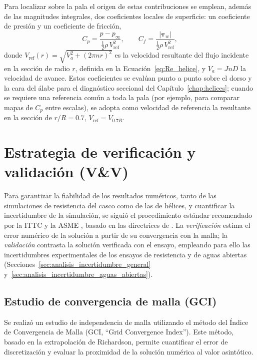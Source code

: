 Para localizar sobre la pala el origen de estas contribuciones se emplean, además de
las magnitudes integrales, dos coeficientes locales de superficie: un coeficiente de
presión y un coeficiente de fricción,
%
\begin{equation}
        C_{p} = \frac{p - p_\infty}{\tfrac{1}{2}\rho\,V_{\text{ref}}^2},
    \qquad
    C_f = \frac{|\boldsymbol{\tau}_w|}{\tfrac{1}{2}\rho\,V_{\text{ref}}^2},
    \label{eq:cpn_cf_def}
\end{equation}
%
donde $V_{\text{ref}}(r) = \sqrt{V_a^2 + (2\pi n r)^2}$ es la velocidad resultante del flujo incidente en la sección de radio $r$, definida en la Ecuación~\eqref{eq:Re_helice}, y $V_a = J n D$ la velocidad de avance. Estos coeficientes se evalúan
punto a punto sobre el dorso y la cara del álabe para el diagnóstico seccional del
Capítulo~\ref{chap:helices}; cuando se requiere una referencia común a toda la pala
(por ejemplo, para comparar mapas de $C_p$ entre escalas), se adopta como velocidad de
referencia la resultante en la sección de $r/R = 0.7$, $V_{\text{ref}} = V_{0.7R}$.

\section{Estrategia de verificación y validación (V\&V)}

Para garantizar la fiabilidad de los resultados numéricos, tanto de las simulaciones de resistencia del casco como de las de hélices, y cuantificar la incertidumbre de la simulación, se siguió el procedimiento estándar recomendado por la ITTC \citep{ITTC_uncertainty_CFD} y la ASME \citep{asme}, basado en las directrices de \citet{freitas}. La \emph{verificación} estima el error numérico de la solución a partir de su convergencia con la malla; la \emph{validación} contrasta la solución verificada con el ensayo, empleando para ello las incertidumbres experimentales de los ensayos de resistencia y de aguas abiertas (Secciones~\ref{sec:analisis_incertidumbre_general} y~\ref{sec:analisis_incertidumbre_aguas_abiertas}).

\subsection{Estudio de convergencia de malla (GCI)}
\label{sec:convergencia_de_malla}

Se realizó un estudio de independencia de malla utilizando el método del Índice de Convergencia de Malla (GCI, ``Grid Convergence Index''). Este método, basado en la extrapolación de Richardson, permite cuantificar el error de discretización y evaluar la proximidad de la solución numérica al valor asintótico.


